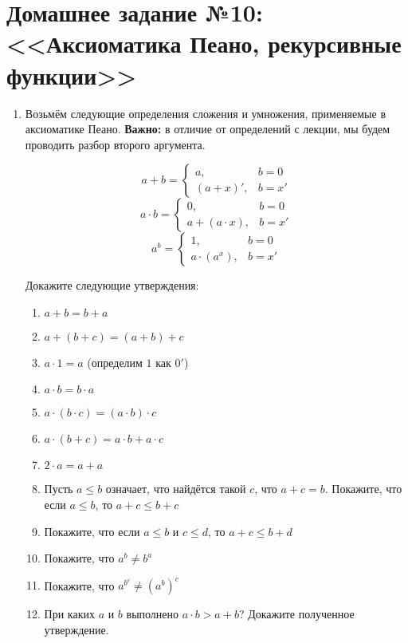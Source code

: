 \documentclass[10pt,a4paper,oneside]{article}
\begin{document}
\section*{Домашнее задание №10: <<Аксиоматика Пеано, рекурсивные функции>>}

\begin{enumerate}

\item Возьмём следующие определения сложения и умножения, применяемые в аксиоматике Пеано.
{\bfseries Важно:} в отличие от определений с лекции, мы будем проводить разбор второго аргумента.

$$a + b = \left\{\begin{array}{ll}
a, & b = 0\\
(a + x)', & b = x'
\end{array}\right.$$
$$a \cdot b = \left\{\begin{array}{ll}
0, & b = 0\\
a + (a \cdot x), & b = x'
\end{array}\right.$$
$$a^b = \left\{\begin{array}{ll}
1, & b = 0\\
a \cdot (a ^ x), & b = x'
\end{array}\right.$$

Докажите следующие утверждения:
\begin{enumerate}
\item $a + b = b + a$
\item $a + (b + c) = (a+b) + c$
\item $a \cdot 1 = a$ (определим $1$ как $0'$)
\item $a \cdot b = b \cdot a$
\item $a \cdot (b \cdot c) = (a \cdot b) \cdot c$
\item $a \cdot (b + c) = a \cdot b + a \cdot c$
\item $2 \cdot a = a + a$
\item Пусть $a \le b$ означает, что найдётся такой $c$, что $a + c = b$.
Покажите, что если $a \le b$, то $a + c \le b + c$
\item Покажите, что если $a \le b$ и $c \le d$, то $a+c \le b+d$
\item Покажите, что $a^b \ne b^a$
\item Покажите, что $a^{b^c} \ne (a^b)^c$
\item При каких $a$ и $b$ выполнено $a\cdot b > a + b$? Докажите полученное утверждение.
\end{enumerate}


\end{enumerate}
\end{document}
